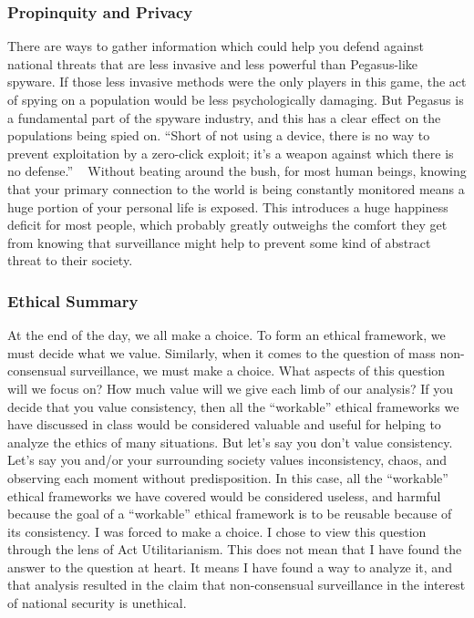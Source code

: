\documentclass[sigconf]{acmart}
\begin{document}
\subsubsection{Propinquity and Privacy}
There are ways to gather information which could help you defend against national threats that are less invasive and less powerful than Pegasus-like spyware. If those less invasive methods were the only players in this game, the act of spying on a population would be less psychologically damaging. But Pegasus is a fundamental part of the spyware industry, and this has a clear effect on the populations being spied on. “Short of not using a device, there is no way to prevent exploitation by a zero-click exploit; it's a weapon against which there is no defense.” ~\cite{used_eighth(5)} Without beating around the bush, for most human beings, knowing that your primary connection to the world is being constantly monitored means a huge portion of your personal life is exposed. This introduces a huge happiness deficit for most people, which probably greatly outweighs the comfort they get from knowing that surveillance might help to prevent some kind of abstract threat to their society.
\subsubsection{Ethical Summary}
At the end of the day, we all make a choice. To form an ethical framework, we must decide what we value. Similarly, when it comes to the question of mass non-consensual surveillance, we must make a choice. What aspects of this question will we focus on? How much value will we give each limb of our analysis? If you decide that you value consistency, then all the “workable” ethical frameworks we have discussed in class would be considered valuable and useful for helping to analyze the ethics of many situations. But let's say you don't value consistency. Let's say you and/or your surrounding society values inconsistency, chaos, and observing each moment without predisposition. In this case, all the “workable” ethical frameworks we have covered would be considered useless, and harmful because the goal of a “workable” ethical framework is to be reusable because of its consistency. I was forced to make a choice. I chose to view this question through the lens of Act Utilitarianism. This does not mean that I have found the answer to the question at heart. It means I have found a way to analyze it, and that analysis resulted in the claim that non-consensual surveillance in the interest of national security is unethical.
\end{document}
